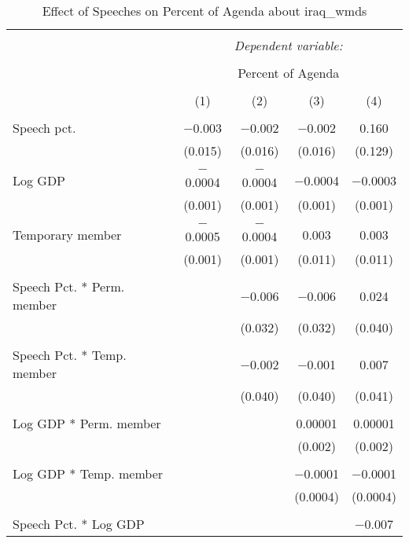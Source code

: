 
\begin{table}[!htbp] \centering 
  \caption{Effect of Speeches on Percent of Agenda about  iraq_wmds} 
  \label{} 
\begin{tabular}{@{\extracolsep{5pt}}lcccc} 
\\[-1.8ex]\hline 
\hline \\[-1.8ex] 
 & \multicolumn{4}{c}{\textit{Dependent variable:}} \\ 
\cline{2-5} 
\\[-1.8ex] & \multicolumn{4}{c}{Percent of Agenda} \\ 
\\[-1.8ex] & (1) & (2) & (3) & (4)\\ 
\hline \\[-1.8ex] 
 Speech pct. & $-$0.003 & $-$0.002 & $-$0.002 & 0.160 \\ 
  & (0.015) & (0.016) & (0.016) & (0.129) \\ 
  & & & & \\ 
 Log GDP & $-$0.0004 & $-$0.0004 & $-$0.0004 & $-$0.0003 \\ 
  & (0.001) & (0.001) & (0.001) & (0.001) \\ 
  & & & & \\ 
 Temporary member & $-$0.0005 & $-$0.0004 & 0.003 & 0.003 \\ 
  & (0.001) & (0.001) & (0.011) & (0.011) \\ 
  & & & & \\ 
 Speech Pct. * Perm. member &  & $-$0.006 & $-$0.006 & 0.024 \\ 
  &  & (0.032) & (0.032) & (0.040) \\ 
  & & & & \\ 
 Speech Pct. * Temp. member &  & $-$0.002 & $-$0.001 & 0.007 \\ 
  &  & (0.040) & (0.040) & (0.041) \\ 
  & & & & \\ 
 Log GDP * Perm. member &  &  & 0.00001 & 0.00001 \\ 
  &  &  & (0.002) & (0.002) \\ 
  & & & & \\ 
 Log GDP * Temp. member &  &  & $-$0.0001 & $-$0.0001 \\ 
  &  &  & (0.0004) & (0.0004) \\ 
  & & & & \\ 
 Speech Pct. * Log GDP &  &  &  & $-$0.007 \\ 

\end{tabular}
\end{table}
